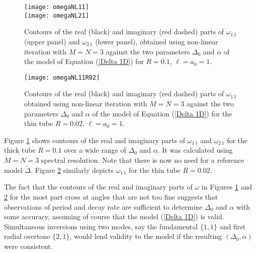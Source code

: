 \documentclass[12pt]{iopart}
\renewcommand{\L}{{\ell}}
\begin{document}
\begin{figure}[htbp]
\begin{center}
\texttt{[image: omegaNL11]}\\[6pt]
\texttt{[image: omegaNL21]}
\caption{Contours of the real (black) and imaginary (red dashed) parts of $\omega_{1\,1}$ (upper panel) and $\omega_{2\,1}$ (lower panel), obtained using non-linear iteration with $M=N=3$ against the two parameters $\Delta_0$ and $\alpha$ of the model of Equation (\ref{Delta 1D}) for $R=0.1$, $\L=a_0=1$.}
\label{fig:omegaNL}
\end{center}
\end{figure}

\begin{figure}[htbp]
\begin{center}
\texttt{[image: omegaNL11R02]}
\caption{Contours of the real (black) and imaginary (red dashed) parts of $\omega_{1\,1}$ obtained using non-linear iteration with $M=N=3$ against the two parameters $\Delta_0$ and $\alpha$ of the model of Equation (\ref{Delta 1D}) for the thin tube $R=0.02$, $\L=a_0=1$.}
\label{fig:omegaNLR02}
\end{center}
\end{figure}

Figure \ref{fig:omegaNL} shows contours of the real and imaginary parts of $\omega_{1\,1}$ and $\omega_{2\,1}$ for the thick tube $R=0.1$ over a wide range of $\Delta_0$ and $\alpha$. It was calculated using $M=N=3$ spectral resolution. Note that there is now no need for a reference model $\tilde\Delta$. Figure \ref{fig:omegaNLR02} similarly depicts $\omega_{1\,1}$ for the thin tube $R=0.02$.  

The fact that the contours of the real and imaginary parts of $\omega$ in Figures \ref{fig:omegaNL} and \ref{fig:omegaNLR02} for the most part cross at angles that are not too fine suggests that observations of period and decay rate are sufficient to determine $\Delta_0$ and $\alpha$ with some accuracy, assuming of course that the model (\ref{Delta 1D}) is valid. Simultaneous inversions using two modes, say the fundamental $\{1,1\}$ and first radial overtone $\{2,1\}$, would lend validity to the model if the resulting $(\Delta_0,\alpha)$ were consistent.

\end{document}
